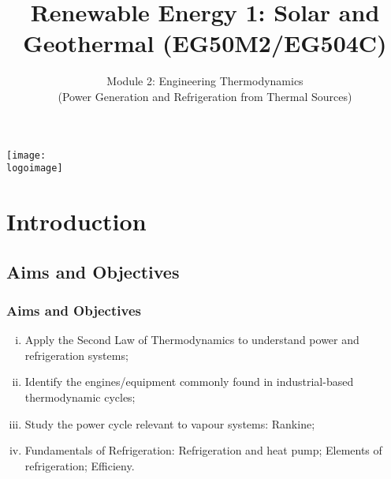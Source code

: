\documentclass[10pt,compress,handout,unknownkeysallowed]{beamer}
\institute{School of Engineering}
\title{Renewable Energy 1: Solar and Geothermal (EG50M2/EG504C)}
\subtitle{Module 2: Engineering Thermodynamics \\ (Power Generation and Refrigeration from Thermal Sources)}
\date[ ]{ }
\newcommand{\logoimage}{../FigBanner/UoAHorizBanner}
\begin{document}
\begin{frame}
  \titlepage
  \vfill%
  \begin{center}
    \texttt{[image: \\logoimage]}
  \end{center}
\end{frame}







\section{Introduction}

 \subsection{Aims and Objectives}
   \begin{frame}
     \frametitle{Aims and Objectives}
     \begin{enumerate}[(i)]
       \item <1-> Apply the Second Law of Thermodynamics to understand power and refrigeration systems;
       \item <1-> Identify the engines/equipment commonly found in industrial-based thermodynamic cycles; 
       \item <1-> Study the power cycle relevant to vapour systems: Rankine; 
       \item <1-> Fundamentals of Refrigeration: Refrigeration and heat pump; Elements of refrigeration; Efficieny.
 \end{enumerate}
   \end{frame}
\end{document}
